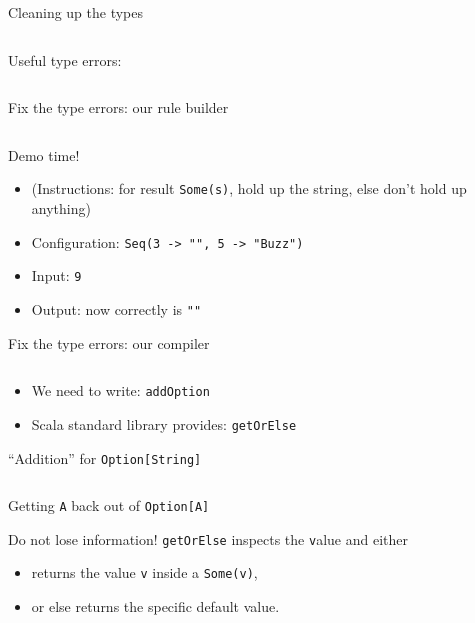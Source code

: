 \begin{frame}[fragile]{Cleaning up the types}
  \inputminted[gobble=2]{scala}{FizzBuzz6.scala}

  Useful type errors:

  \inputminted[gobble=2]{console}{testQuick10.console}
\end{frame}

\begin{frame}[fragile]{Fix the type errors: our rule builder}
  \inputminted[gobble=2]{scala}{FizzBuzz7Rule.scala}

  \begin{block}{Demo time!}
    \begin{itemize}
    \item (Instructions: for result \texttt{Some(s)}, hold up the string, else don't hold up anything)
    \item Configuration: \texttt{Seq(3 -> "", 5 -> "Buzz")}
    \item Input: \texttt{9}
    \item Output: now correctly is \texttt{""}
    \end{itemize}
  \end{block}
\end{frame}

\begin{frame}[fragile]{Fix the type errors: our compiler}
  \inputminted[gobble=2]{scala}{FizzBuzz7.scala}

  \begin{itemize}
  \item We need to write: \texttt{addOption}
  \item Scala standard library provides: \texttt{getOrElse}
  \end{itemize}
\end{frame}

\begin{frame}[fragile]{``Addition'' for \texttt{Option[String]}}
  \inputminted[gobble=2]{scala}{FizzBuzz8.scala}
\end{frame}

\begin{frame}[fragile]{Getting \texttt{A} back out of \texttt{Option[A]}}
  \begin{block}{Do not lose information!}
    \texttt{getOrElse} inspects the \texttt value and either
    \begin{itemize}
    \item returns the value \texttt{v} inside a \texttt{Some(v)},
    \item or else returns the specific default value.
    \end{itemize}
  \end{block}
\end{frame}

